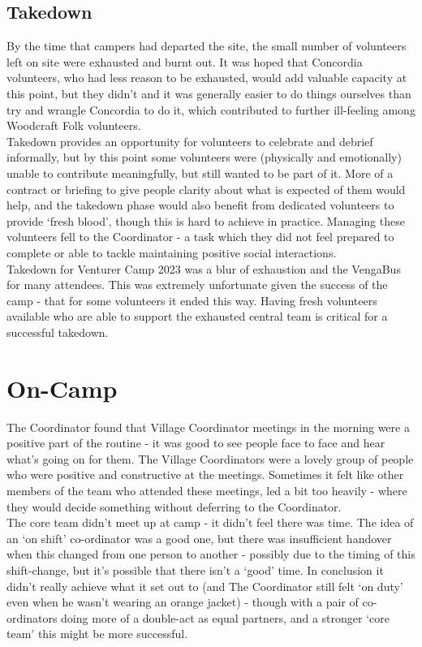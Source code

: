 \subsection{Takedown}
By the time that campers had departed the site, the small number of volunteers left on site were exhausted and burnt out. It was hoped that Concordia volunteers, who had less reason to be exhausted, would add valuable capacity at this point, but they didn't and it was generally easier to do things ourselves than try and wrangle Concordia to do it, which contributed to further ill-feeling among Woodcraft Folk volunteers.\\

Takedown provides an opportunity for volunteers to celebrate and debrief informally, but by this point some volunteers were (physically and emotionally) unable to contribute meaningfully, but still wanted to be part of it. More of a contract or briefing to give people clarity about what is expected of them would help, and the takedown phase would also benefit from dedicated volunteers to provide `fresh blood', though this is hard to achieve in practice. Managing these volunteers fell to the Coordinator - a task which they did not feel prepared to complete or able to tackle maintaining positive social interactions. \\

Takedown for Venturer Camp 2023 was a blur of exhaustion and the VengaBus for many attendees. This was extremely unfortunate given the success of the camp - that for some volunteers it ended this way. Having fresh volunteers available who are able to support the exhausted central team is critical for a successful takedown. 

\section{On-Camp}
The Coordinator found that Village Coordinator meetings in the morning were a positive part of the routine - it was good to see people face to face and hear what's going on for them. The Village Coordinators were a lovely group of people who were positive and constructive at the meetings. Sometimes it felt like other members of the team who attended these meetings, led a bit too heavily - where they would decide something without deferring to the Coordinator. \\

The core team didn't meet up at camp - it didn't feel there was time. The idea of an `on shift' co-ordinator was a good one, but there was insufficient handover when this changed from one person to another - possibly due to the timing of this shift-change, but it's possible that there isn't a `good' time. In conclusion it didn't really achieve what it set out to (and The Coordinator still felt `on duty' even when he wasn't wearing an orange jacket) - though with a pair of co-ordinators doing more of a double-act as equal partners, and a stronger `core team' this might be more successful.\\

